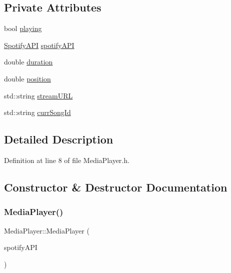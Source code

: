\subsection*{Private Attributes}
\begin{DoxyCompactItemize}
\item 
bool \mbox{\hyperlink{class_media_player_aa533b394a2366f49cabcb60562ef6a6c}{playing}}
\item 
\mbox{\hyperlink{class_spotify_a_p_i}{Spotify\+A\+PI}} \mbox{\hyperlink{class_media_player_a1aa28d49d3a69b24d23e7564d00ecb89}{spotify\+A\+PI}}
\item 
double \mbox{\hyperlink{class_media_player_a4d2803d894f3fa699f281b46fdbe4f27}{duration}}
\item 
double \mbox{\hyperlink{class_media_player_a7fae8625cd922cc1059427d7c74d4fdf}{position}}
\item 
std\+::string \mbox{\hyperlink{class_media_player_ae236af5daf2a13066c3f21c4b4137ade}{stream\+U\+RL}}
\item 
std\+::string \mbox{\hyperlink{class_media_player_a28a6b20199f2c144a78b7e91a6b65bf2}{curr\+Song\+Id}}
\end{DoxyCompactItemize}


\subsection{Detailed Description}


Definition at line 8 of file Media\+Player.\+h.



\subsection{Constructor \& Destructor Documentation}
\mbox{\label{class_media_player_a7f93c5a1a991ed298828f93524ddfc2c}} 
\subsubsection{\texorpdfstring{Media\+Player()}{MediaPlayer()}\hspace{0.1cm}{\footnotesize\ttfamily [1/2]}}
{\footnotesize\ttfamily Media\+Player\+::\+Media\+Player (\begin{DoxyParamCaption}\item[{\mbox{\hyperlink{class_spotify_a_p_i}{Spotify\+A\+PI}}}]{spotify\+A\+PI }\end{DoxyParamCaption})}



